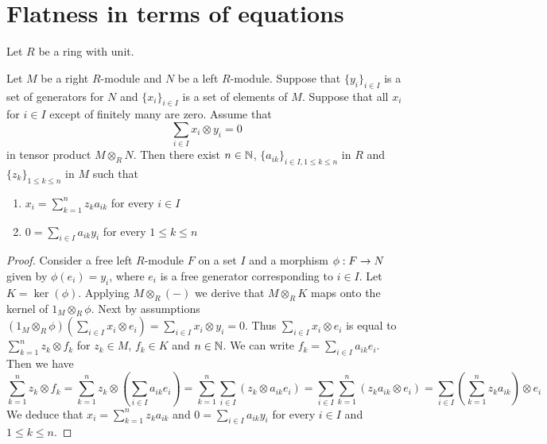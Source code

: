 \section{Flatness in terms of equations}
\noindent
Let $R$ be a ring with unit.

\begin{proposition}\label{proposition:zerocriterion}
Let $M$ be a right $R$-module and $N$ be a left $R$-module. Suppose that $\{y_i\}_{i\in I}$ is a set of generators for $N$ and $\{x_i\}_{i\in I}$ is a set of  elements of $M$. Suppose that all $x_i$ for $i\in I$ except of finitely many are zero. Assume that
$$\sum_{i\in I}x_i\otimes y_i=0$$
in tensor product $M\otimes_RN$. Then there exist $n\in {\mathbb N}$, $\{a_{ik}\}_{i\in I,1\leq k\leq n}$ in $R$ and $\{z_k\}_{1\leq k\leq n}$ in $M$ such that
\begin{enumerate}[label=\emph{\textbf{(\arabic*)}}, leftmargin=1.5em]
\item $x_i=\sum^n_{k=1}z_ka_{ik}$ for every $i\in I$
\item $0=\sum_{i\in I}a_{ik}y_i$ for every $1\leq k\leq n$
\end{enumerate}
\end{proposition}
\begin{proof}
Consider a free left $R$-module $F$ on a set $I$ and a morphism $\phi:F\rightarrow N$ given by $\phi(e_i)=y_i$, where $e_i$ is a free generator corresponding to $i\in I$. Let $K=\ker( \phi)$. Applying $M\otimes_R(-)$ we derive that $M\otimes_RK$ maps onto the kernel of $1_M\otimes_R\phi$.
Next by assumptions $(1_M\otimes_R\phi)(\sum_{i\in I}x_i\otimes e_i)=\sum_{i\in I}x_i\otimes y_i=0$. Thus $\sum_{i\in I}x_i\otimes e_i$ is equal to $\sum^n_{k=1}z_k\otimes f_k$ for $z_k\in M$, $f_k\in K$ and $n\in {\mathbb N}$. We can write $f_k=\sum_{i\in I}a_{ik}e_i$. Then we have
$$\sum^n_{k=1}z_k\otimes f_k=\sum^n_{k=1}z_k\otimes\left(\sum_{i\in I}a_{ik}e_i\right)=\sum^n_{k=1}\sum_{i\in I}\left(z_k\otimes a_{ik}e_i\right)=\sum_{i\in I}\sum^n_{k=1}\left(z_ka_{ik}\otimes e_i\right)=\sum_{i\in I}\left(\sum^n_{k=1}z_k a_{ik}\right)\otimes e_i$$
We deduce that $x_i=\sum^n_{k=1}z_ka_{ik}$ and $0=\sum_{i\in I}a_{ik}y_i$  for every $i\in I$ and $1\leq k\leq n$.
\end{proof}

